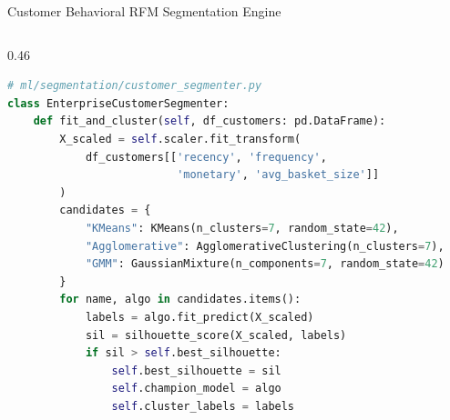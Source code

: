 \documentclass[10pt]{beamer}
\begin{document}
\begin{frame}[fragile]{Customer Behavioral RFM Segmentation Engine}
\begin{columns}[T]
\begin{column}{0.46\textwidth}
\begin{lstlisting}[language=Python]
# ml/segmentation/customer_segmenter.py
class EnterpriseCustomerSegmenter:
    def fit_and_cluster(self, df_customers: pd.DataFrame):
        X_scaled = self.scaler.fit_transform(
            df_customers[['recency', 'frequency', 
                          'monetary', 'avg_basket_size']]
        )
        candidates = {
            "KMeans": KMeans(n_clusters=7, random_state=42),
            "Agglomerative": AgglomerativeClustering(n_clusters=7),
            "GMM": GaussianMixture(n_components=7, random_state=42)
        }
        for name, algo in candidates.items():
            labels = algo.fit_predict(X_scaled)
            sil = silhouette_score(X_scaled, labels)
            if sil > self.best_silhouette:
                self.best_silhouette = sil
                self.champion_model = algo
                self.cluster_labels = labels
\end{lstlisting}
    \end{column}
\end{columns}
\end{frame}
\end{document}
